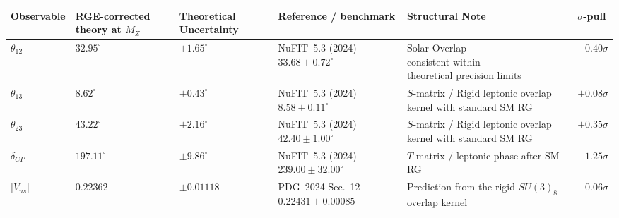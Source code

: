 {\setlength{\tabcolsep}{2pt}
\renewcommand{\arraystretch}{1.00}
\begin{tabular}{|>{\raggedright\arraybackslash}p{}|>{\centering\arraybackslash}p{}|>{\centering\arraybackslash}p{}|>{\centering\arraybackslash}p{}|>{\raggedright\arraybackslash}p{}|>{\centering\arraybackslash}p{}|}
\hline
Observable & RGE-corrected theory at $M_Z$ & Theoretical Uncertainty & Reference / benchmark & Structural Note & $\sigma$-pull \\
\hline
$\theta_{12}$ & $32.95^\circ$ & $\pm 1.65^\circ$ & \shortstack{\scriptsize NuFIT~5.3\\(2024) \\ $33.68\pm0.72^\circ$} & \shortstack{\scriptsize Solar-Overlap\\ \scriptsize consistent within\\ \scriptsize theoretical precision limits} & $-0.40\sigma$ \\
$\theta_{13}$ & $8.62^\circ$ & $\pm 0.43^\circ$ & \shortstack{\scriptsize NuFIT~5.3\\(2024) \\ $8.58\pm0.11^\circ$} & \shortstack{\scriptsize $S$-matrix / Rigid\\ \scriptsize leptonic overlap kernel\\ \scriptsize with standard SM RG} & $+0.08\sigma$ \\
$\theta_{23}$ & $43.22^\circ$ & $\pm 2.16^\circ$ & \shortstack{\scriptsize NuFIT~5.3\\(2024) \\ $42.40\pm1.00^\circ$} & \shortstack{\scriptsize $S$-matrix / Rigid\\ \scriptsize leptonic overlap kernel\\ \scriptsize with standard SM RG} & $+0.35\sigma$ \\
$\delta_{CP}$ & $197.11^\circ$ & $\pm 9.86^\circ$ & \shortstack{\scriptsize NuFIT~5.3\\(2024) \\ $239.00\pm32.00^\circ$} & \shortstack{\scriptsize $T$-matrix / leptonic phase\\ \scriptsize after SM RG} & $-1.25\sigma$ \\
$|V_{us}|$ & $0.22362$ & $\pm 0.01118$ & \shortstack{\scriptsize PDG~2024\\Sec.~12 \\ $0.22431\pm0.00085$} & \shortstack{\scriptsize Prediction\\ \scriptsize from the rigid $SU(3)_8$\\ \scriptsize overlap kernel} & $-0.06\sigma$ \\

\end{tabular}}
